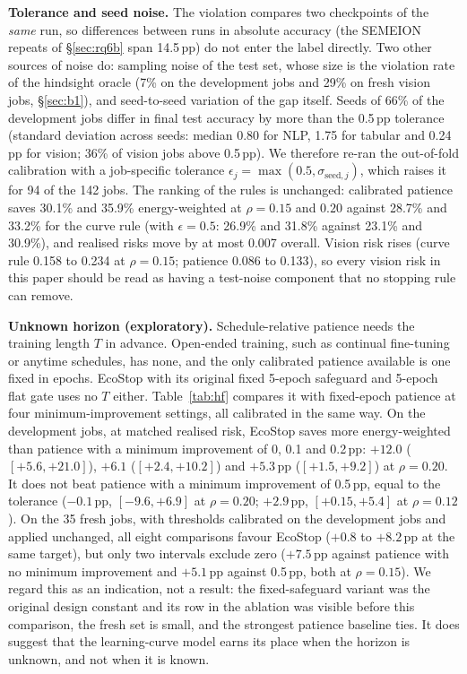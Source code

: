 \documentclass[3p,twocolumn,10pt]{elsarticle}
\theoremstyle{definition}
\begin{document}
\textbf{Tolerance and seed noise.} The violation compares two checkpoints of the \emph{same} run, so differences between runs in absolute accuracy (the SEMEION repeats of \S\ref{sec:rq6b} span 14.5\,pp) do not enter the label directly. Two other sources of noise do: sampling noise of the test set, whose size is the violation rate of the hindsight oracle (7\% on the development jobs and 29\% on fresh vision jobs, \S\ref{sec:b1}), and seed-to-seed variation of the gap itself. Seeds of 66\% of the development jobs differ in final test accuracy by more than the 0.5\,pp tolerance (standard deviation across seeds: median 0.80 for NLP, 1.75 for tabular and 0.24\,pp for vision; 36\% of vision jobs above 0.5\,pp). We therefore re-ran the out-of-fold calibration with a job-specific tolerance $\epsilon_j=\max(0.5,\sigma_{\mathrm{seed},j})$, which raises it for 94 of the 142 jobs. The ranking of the rules is unchanged: calibrated patience saves 30.1\% and 35.9\% energy-weighted at $\rho=0.15$ and $0.20$ against 28.7\% and 33.2\% for the curve rule (with $\epsilon=0.5$: 26.9\% and 31.8\% against 23.1\% and 30.9\%), and realised risks move by at most 0.007 overall. Vision risk rises (curve rule 0.158 to 0.234 at $\rho=0.15$; patience 0.086 to 0.133), so every vision risk in this paper should be read as having a test-noise component that no stopping rule can remove.

\textbf{Unknown horizon (exploratory).} Schedule-relative patience needs the training length $T$ in advance. Open-ended training, such as continual fine-tuning or anytime schedules, has none, and the only calibrated patience available is one fixed in epochs. EcoStop with its original fixed 5-epoch safeguard and 5-epoch flat gate uses no $T$ either. Table~\ref{tab:hf} compares it with fixed-epoch patience at four minimum-improvement settings, all calibrated in the same way. On the development jobs, at matched realised risk, EcoStop saves more energy-weighted than patience with a minimum improvement of 0, 0.1 and 0.2\,pp: $+12.0$ ($[+5.6,+21.0]$), $+6.1$ ($[+2.4,+10.2]$) and $+5.3$\,pp ($[+1.5,+9.2]$) at $\rho=0.20$. It does not beat patience with a minimum improvement of 0.5\,pp, equal to the tolerance ($-0.1$\,pp, $[-9.6,+6.9]$ at $\rho=0.20$; $+2.9$\,pp, $[+0.15,+5.4]$ at $\rho=0.12$). On the 35 fresh jobs, with thresholds calibrated on the development jobs and applied unchanged, all eight comparisons favour EcoStop ($+0.8$ to $+8.2$\,pp at the same target), but only two intervals exclude zero ($+7.5$\,pp against patience with no minimum improvement and $+5.1$\,pp against 0.5\,pp, both at $\rho=0.15$). We regard this as an indication, not a result: the fixed-safeguard variant was the original design constant and its row in the ablation was visible before this comparison, the fresh set is small, and the strongest patience baseline ties. It does suggest that the learning-curve model earns its place when the horizon is unknown, and not when it is known.
\end{document}
